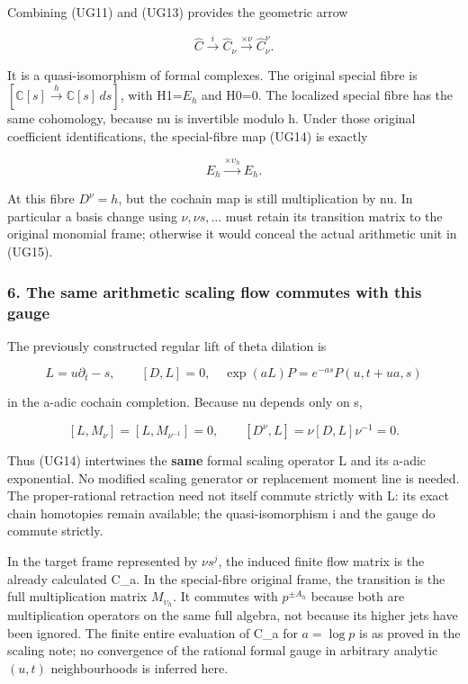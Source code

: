 Combining (UG11) and (UG13) provides the geometric arrow

\[
\boxed{\widehat C\xrightarrow{i}\widehat C_\nu
\xrightarrow{\times\nu}\widehat C_\nu^{\nu}.}
\tag{UG14}
\]

It is a quasi-isomorphism of formal complexes. The original special fibre is \([\mathbb C[s]\xrightarrow{h}\mathbb C[s]\,ds]\), with H1=\(E_h\) and H0=0. The localized special fibre has the same cohomology, because nu is invertible modulo h. Under those original coefficient identifications, the special-fibre map (UG14) is exactly

\[
E_h\xrightarrow{\times\upsilon_h}E_h.
\tag{UG15}
\]

At this fibre \(D^\nu=h\), but the cochain map is still multiplication by nu. In particular a basis change using \(\nu,\nu s,\ldots\) must retain its transition matrix to the original monomial frame; otherwise it would conceal the actual arithmetic unit in (UG15).

\subsubsection{6. The same arithmetic scaling flow commutes with this gauge}\label{endpoint-f1_unit_gauge--the-same-arithmetic-scaling-flow-commutes-with-this-gauge}

The previously constructed regular lift of theta dilation is

\[
L=u\partial_t-s,\qquad [D,L]=0,
\quad \exp(aL)P=e^{-as}P(u,t+ua,s)
\tag{UG16}
\]

in the a-adic cochain completion. Because nu depends only on s,

\[
[L,M_\nu]=[L,M_{\nu^{-1}}]=0,
\qquad[D^{\nu},L]=\nu[D,L]\nu^{-1}=0.
\tag{UG17}
\]

Thus (UG14) intertwines the \textbf{same} formal scaling operator L and its a-adic exponential. No modified scaling generator or replacement moment line is needed. The proper-rational retraction need not itself commute strictly with L: its exact chain homotopies remain available; the quasi-isomorphism i and the gauge do commute strictly.

In the target frame represented by \(\nu s^j\), the induced finite flow matrix is the already calculated C\_a. In the special-fibre original frame, the transition is the full multiplication matrix \(M_{\upsilon_h}\). It commutes with \(p^{\pm A_h}\) because both are multiplication operators on the same full algebra, not because its higher jets have been ignored. The finite entire evaluation of C\_a for \(a=\log p\) is as proved in the scaling note; no convergence of the rational formal gauge in arbitrary analytic \((u,t)\) neighbourhoods is inferred here.

